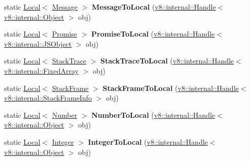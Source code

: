 \begin{DoxyCompactItemize}
static \mbox{\hyperlink{classv8_1_1Local}{Local}}$<$ \mbox{\hyperlink{classv8_1_1Message}{Message}} $>$ {\bfseries Message\+To\+Local} (\mbox{\hyperlink{classv8_1_1internal_1_1Handle}{v8\+::internal\+::\+Handle}}$<$ \mbox{\hyperlink{classv8_1_1internal_1_1Object}{v8\+::internal\+::\+Object}} $>$ obj)
\item 
\mbox{\label{classv8_1_1Utils_a31171eb233e3f46d9eb158b5db59f184}} 
static \mbox{\hyperlink{classv8_1_1Local}{Local}}$<$ \mbox{\hyperlink{classv8_1_1Promise}{Promise}} $>$ {\bfseries Promise\+To\+Local} (\mbox{\hyperlink{classv8_1_1internal_1_1Handle}{v8\+::internal\+::\+Handle}}$<$ \mbox{\hyperlink{classv8_1_1internal_1_1JSObject}{v8\+::internal\+::\+J\+S\+Object}} $>$ obj)
\item 
\mbox{\label{classv8_1_1Utils_a732072a95b5a3b349f62292414f269c3}} 
static \mbox{\hyperlink{classv8_1_1Local}{Local}}$<$ \mbox{\hyperlink{classv8_1_1StackTrace}{Stack\+Trace}} $>$ {\bfseries Stack\+Trace\+To\+Local} (\mbox{\hyperlink{classv8_1_1internal_1_1Handle}{v8\+::internal\+::\+Handle}}$<$ \mbox{\hyperlink{classv8_1_1internal_1_1FixedArray}{v8\+::internal\+::\+Fixed\+Array}} $>$ obj)
\item 
\mbox{\label{classv8_1_1Utils_a5b79894c5e7375abf6595bfc08591a05}} 
static \mbox{\hyperlink{classv8_1_1Local}{Local}}$<$ \mbox{\hyperlink{classv8_1_1StackFrame}{Stack\+Frame}} $>$ {\bfseries Stack\+Frame\+To\+Local} (\mbox{\hyperlink{classv8_1_1internal_1_1Handle}{v8\+::internal\+::\+Handle}}$<$ \mbox{\hyperlink{classv8_1_1internal_1_1StackFrameInfo}{v8\+::internal\+::\+Stack\+Frame\+Info}} $>$ obj)
\item 
\mbox{\label{classv8_1_1Utils_af85cbf57e5ba5902a96abd044c2fc76e}} 
static \mbox{\hyperlink{classv8_1_1Local}{Local}}$<$ \mbox{\hyperlink{classv8_1_1Number}{Number}} $>$ {\bfseries Number\+To\+Local} (\mbox{\hyperlink{classv8_1_1internal_1_1Handle}{v8\+::internal\+::\+Handle}}$<$ \mbox{\hyperlink{classv8_1_1internal_1_1Object}{v8\+::internal\+::\+Object}} $>$ obj)
\item 
\mbox{\label{classv8_1_1Utils_aa6d14167b7e6d2d477a69e3507334c2a}} 
static \mbox{\hyperlink{classv8_1_1Local}{Local}}$<$ \mbox{\hyperlink{classv8_1_1Integer}{Integer}} $>$ {\bfseries Integer\+To\+Local} (\mbox{\hyperlink{classv8_1_1internal_1_1Handle}{v8\+::internal\+::\+Handle}}$<$ \mbox{\hyperlink{classv8_1_1internal_1_1Object}{v8\+::internal\+::\+Object}} $>$ obj)

\end{DoxyCompactItemize}
